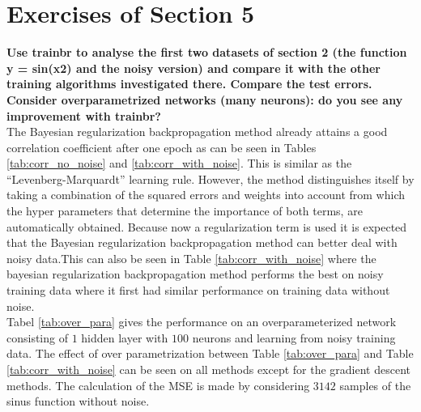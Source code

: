 \documentclass[a4paper,10pt]{article}
\begin{document}
\newpage
\section{Exercises of Section 5}
\textbf{Use trainbr to analyse the first two datasets of section 2 (the function y = sin(x2) and the noisy version) and compare it with the other training algorithms investigated there. Compare the test errors. Consider overparametrized networks (many neurons): do you see any improvement with trainbr?}\\

The Bayesian regularization backpropagation method already attains a good correlation coefficient after one epoch as can be seen in Tables \ref{tab:corr_no_noise} and \ref{tab:corr_with_noise}. This is similar as the ``Levenberg-Marquardt'' learning rule. However, the method distinguishes itself by taking a combination of the squared errors and weights into account from which the hyper parameters that determine the importance of both terms, are automatically obtained. Because now a regularization term is used it is expected that the Bayesian regularization backpropagation method can better deal with noisy data.This can also be seen in Table \ref{tab:corr_with_noise} where the bayesian regularization backpropagation method performs the best on noisy training data where it first had similar performance on training data without noise. \\ Tabel \ref{tab:over_para} gives the performance on an overparameterized network consisting of $ 1 $ hidden layer with $ 100 $ neurons and learning from noisy training data.  The effect of over parametrization between Table \ref{tab:over_para} and Table \ref{tab:corr_with_noise} can be seen on all methods except for the gradient descent methods. The calculation of the MSE is made by considering $ 3142 $ samples of the sinus function without noise.\\
\end{document}
